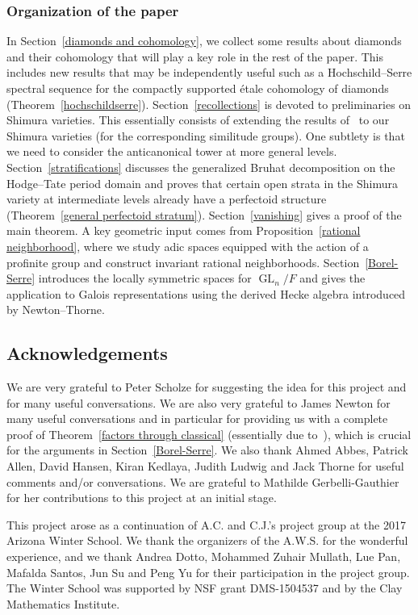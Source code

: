 \documentclass{amsart}
\theoremstyle{remark}
\numberwithin{equation}{subsection}
\DeclareMathOperator{\GL}{GL}
\renewcommand{\(}{\left(}
\renewcommand{\)}{\right)}
\begin{document}
\subsubsection{Organization of the paper} 
In Section~\ref{diamonds and cohomology}, we collect some results about diamonds and their cohomology that will play a key role in the rest of the paper. This includes new results that may be independently useful such as a Hochschild--Serre spectral sequence for the compactly supported \'etale cohomology of diamonds (Theorem~\ref{hochschildserre}). 
Section~\ref{recollections} is devoted to preliminaries on Shimura varieties. This essentially consists of extending the results of~\cite{scholze-galois} to our Shimura varieties (for the corresponding similitude groups). One subtlety is that we need to consider the anticanonical tower at more general levels. 
Section~\ref{stratifications} discusses the generalized Bruhat decomposition on the Hodge--Tate period domain and proves that certain open strata in the Shimura variety at intermediate levels already have a perfectoid structure (Theorem~\ref{general perfectoid stratum}). 
Section~\ref{vanishing} gives a proof of the main theorem. A key geometric input comes from Proposition~\ref{rational neighborhood}, where we study adic spaces equipped with the action of a profinite group and construct invariant rational neighborhoods. 
Section~\ref{Borel-Serre} introduces the locally symmetric spaces for $\GL_n/F$ and 
gives the application to Galois representations using the derived Hecke algebra introduced by Newton--Thorne. 

\subsection{Acknowledgements} We are very grateful to Peter Scholze for suggesting the idea for this project and for many useful conversations. We are also very grateful to James Newton for many useful conversations and in particular for providing us with a complete proof of Theorem~\ref{factors through classical} (essentially due to~\cite{newton-thorne}), which is crucial for the arguments in Section~\ref{Borel-Serre}. We also thank Ahmed Abbes, Patrick Allen, David Hansen, Kiran Kedlaya, Judith Ludwig and Jack Thorne for useful comments and/or conversations. We are grateful to Mathilde Gerbelli-Gauthier for her contributions to this project at an initial stage. 

This project arose as a continuation of A.C. and C.J.'s project group at the 2017 Arizona Winter School. We thank the organizers of the A.W.S. for the wonderful experience, and we thank Andrea Dotto, Mohammed Zuhair Mullath, Lue Pan, Mafalda Santos, Jun Su and Peng Yu for their participation in the project group. The Winter School was supported by NSF grant DMS-1504537 and by the Clay Mathematics Institute. 
\end{document}
